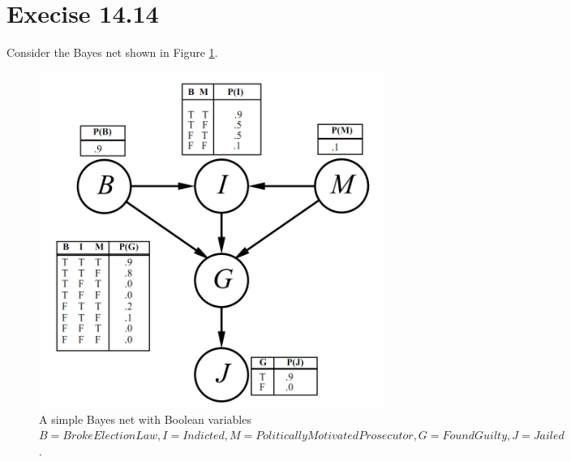 \documentclass{article}
\begin{document}
\section{Execise 14.14}
Consider the Bayes net shown in Figure \ref{fig:2}.
\begin{figure}[ht]
  \centering
  \includegraphics[scale=0.2]{fig14_23.jpg}
  \caption{A simple Bayes net with Boolean variables $B =
    BrokeElectionLaw, I = Indicted, M =
    PoliticallyMotivatedProsecutor, G = FoundGuilty, J = Jailed$. }
  \label{fig:2}
\end{figure}
\end{document}
